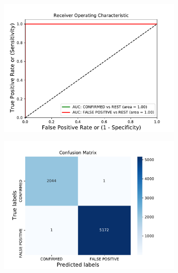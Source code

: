 \begin{figure}[H]
                \centering
                \begin{subfigure}{.49\textwidth}
                \includegraphics[width = 1\textwidth]{data/bRF_overfit_roc.pdf}
                \end{subfigure}
                \begin{subfigure}{.49\textwidth}
                \includegraphics[width = 1\textwidth]{data/bRF_overfit_cm.pdf}
                \end{subfigure}
                \begin{subfigure}{.49\textwidth}

\end{subfigure}
\end{figure}
